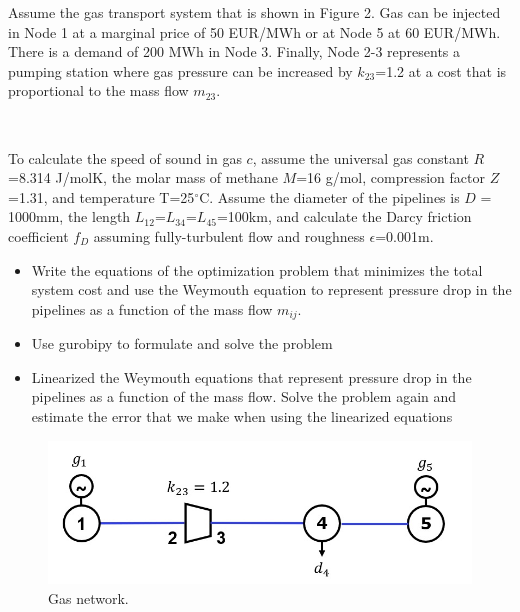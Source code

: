 \documentclass[10pt]{article}
\newenvironment{problem}[2][Problem]{\begin{trivlist}
\item[\hskip \labelsep {\bfseries #1}\hskip \labelsep {\bfseries #2.}]}{\end{trivlist}}
\begin{document}
\begin{problem}{6.3}

Assume the gas transport system that is shown in Figure 2. Gas can be injected in Node 1 at a marginal price of 50 EUR/MWh or at Node 5 at 60 EUR/MWh. There is a demand of 200 MWh in Node 3. Finally, Node 2-3 represents a pumping station where gas pressure can be increased by $k_{23}$=1.2 at a cost that is proportional to the mass flow $m_{23}$.

\

To calculate the speed of sound in gas $c$, assume the universal gas constant $R$=8.314 J/molK, the molar mass of methane $M$=16 g/mol, compression factor $Z$=1.31, and temperature T=25$^{\circ}$C. Assume the diameter of the pipelines is $D$ = 1000mm, the length $L_{12}$=$L_{34}$=$L_{45}$=100km, and calculate the Darcy friction  coefficient $f_{D}$ assuming fully-turbulent flow and roughness $\epsilon$=0.001m. 

\begin{itemize}

\item[a)] Write the equations of the optimization problem that minimizes the total system cost and use the Weymouth equation to represent pressure drop in the pipelines as a function of the mass flow $m_{ij}$.


\item[b)] Use gurobipy to formulate and solve the problem

\item[C)] Linearized the Weymouth equations that represent pressure drop in the pipelines as a function of the mass flow. Solve the problem again and estimate the error that we make when using the linearized equations
\end{itemize}

\begin{figure}
    \centering
    \includegraphics[width=0.6\linewidth]{figures/gas_network.jpg}
    \caption{Gas network.}
    \label{fig_network}
\end{figure}


\end{problem}

\end{document}
